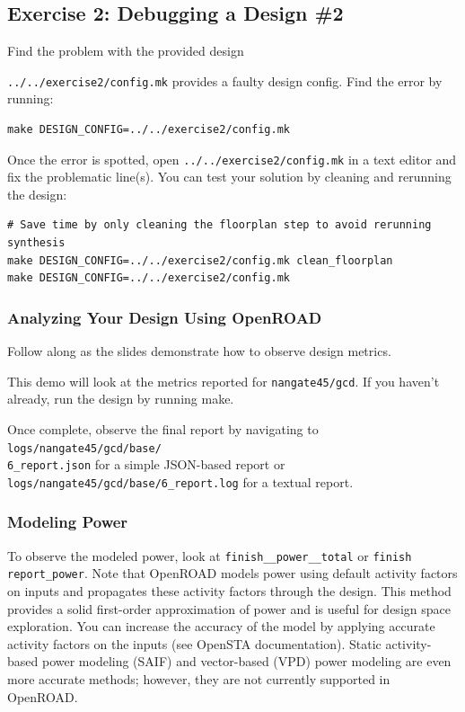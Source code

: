 \documentclass[a4paper,12pt,twoside]{article}
\begin{document}
\subsection{Exercise 2: Debugging a Design \#2}\label{SE2}
Find the problem with the provided design

\texttt{../../exercise2/config.mk} provides a faulty design config. Find the error by running:
\begin{verbatim}
make DESIGN_CONFIG=../../exercise2/config.mk
\end{verbatim}
Once the error is spotted, open \texttt{../../exercise2/config.mk} in a text editor and fix the problematic line(s). You can test your solution by cleaning and rerunning the design:
\begin{verbatim}
# Save time by only cleaning the floorplan step to avoid rerunning synthesis
make DESIGN_CONFIG=../../exercise2/config.mk clean_floorplan
make DESIGN_CONFIG=../../exercise2/config.mk
\end{verbatim}
\subsubsection{Analyzing Your Design Using OpenROAD}
Follow along as the slides demonstrate how to observe design metrics.

This demo will look at the metrics reported for \texttt{nangate45/gcd}. If you haven't already, run the design by running make.

Once complete, observe the final report by navigating to \texttt{logs/nangate45/gcd/base/\\
6\_report.json} for a simple JSON-based report or \texttt{logs/nangate45/gcd/base/6\_report.log} for a textual report.
\subsubsection{Modeling Power}
To observe the modeled power, look at \texttt{finish\_\_power\_\_total} or \texttt{finish report\_power}. Note that OpenROAD models power using default activity factors on inputs and propagates these activity factors through the design. This method provides a solid first-order approximation of power and is useful for design space exploration. You can increase the accuracy of the model by applying accurate activity factors on the inputs (see OpenSTA documentation). Static activity-based power modeling (SAIF) and vector-based (VPD) power modeling are even more accurate methods; however, they are not currently supported in OpenROAD.
\end{document}
